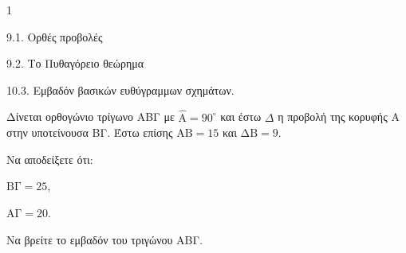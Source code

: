 \begin{ylh}{1}
    \item 9.1. Ορθές προβολές
    \item 9.2. Το Πυθαγόρειο θεώρημα
    \item 10.3. Εμβαδόν βασικών ευθύγραμμων σχημάτων.
\end{ylh}
\begin{figure} %
    \centering
\end{figure}

Δίνεται ορθογώνιο τρίγωνο ΑΒΓ με $\hat{\text{A}} = 90^\circ$ και έστω $\Delta$ η προβολή της κορυφής Α στην υποτείνουσα ΒΓ. Έστω επίσης $\text{ΑΒ} = 15$ και $\text{ΔΒ} = 9$.

\begin{alist}
    \item Να αποδείξετε ότι:
    \begin{rlist}
        \item $\text{ΒΓ} = 25$, 
        \item $\text{ΑΓ} = 20$. 
    \end{rlist}
    \item Να βρείτε το εμβαδόν του τριγώνου ΑΒΓ. 
\end{alist}